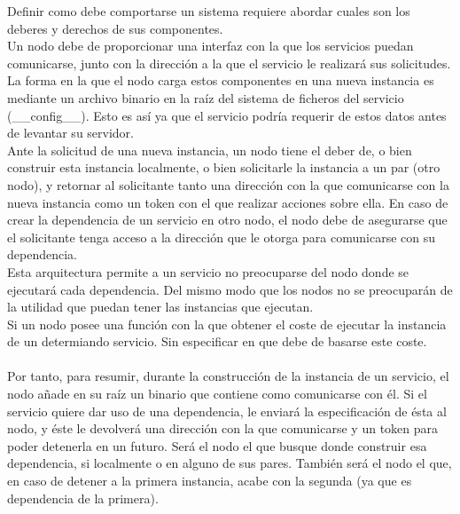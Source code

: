 \documentclass[11pt]{article}
\begin{document}
			Definir como debe comportarse un sistema requiere abordar cuales son los deberes y derechos de sus componentes. \\
			Un nodo debe de proporcionar una interfaz con la que los servicios puedan comunicarse, junto con la dirección
			a la que el servicio le realizará sus solicitudes. La forma en la que el nodo carga estos componentes en una nueva instancia
			es mediante un archivo binario en la raíz del sistema de ficheros del servicio (\_\_config\_\_). Esto es así ya que el servicio podría requerir de
			estos datos antes de levantar su servidor. \\
			Ante la solicitud de una nueva instancia, un nodo tiene el deber de, o bien construir esta instancia localmente, o bien solicitarle la instancia
			a un par (otro nodo), y retornar al solicitante tanto una dirección con la que comunicarse con la nueva instancia como un token
			con el que realizar acciones sobre ella.
			En caso de crear la dependencia de un servicio en otro nodo, el nodo debe de asegurarse que el solicitante tenga acceso a la dirección que le otorga para
			comunicarse con su dependencia. \\
			Esta arquitectura permite a un servicio no preocuparse del nodo donde se ejecutará cada dependencia. Del mismo modo que los nodos no se preocuparán de
			la utilidad que puedan tener las instancias que ejecutan. \\
			Si un nodo posee una función con la que obtener el coste de ejecutar la instancia de un determiando servicio. Sin especificar en que debe de basarse este coste. \\ \\
			Por tanto, para resumir, durante la construcción de la instancia de un servicio, el nodo añade en su raíz un binario que contiene como comunicarse con él.
			Si el servicio quiere dar uso de una dependencia, le enviará la especificación de ésta al nodo, y éste le devolverá una dirección con la que comunicarse y
			un token para poder detenerla en un futuro. Será el nodo el que busque donde construir esa dependencia, si localmente o en alguno de sus pares. También será el nodo el que,
			en caso de detener a la primera instancia, acabe con la segunda (ya que es dependencia de la primera).\\
\end{document}
